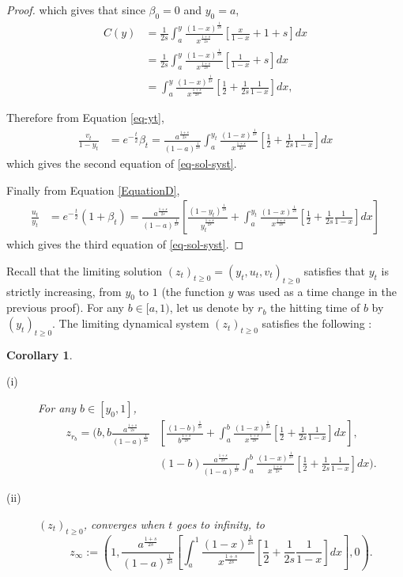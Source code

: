 \documentclass[11pt]{article}
\newtheorem{corollary}[theorem]{Corollary}
\theoremstyle{remark}
\numberwithin{equation}{section}
\begin{document}
\begin{proof}
which gives that since $\beta_0=0$ and $y_0=a$, 
\begin{align*}C(y)&=\frac{1}{2s}\int_a^{y}\frac{(1-x)^{\frac{1}{2s}}}{x^{\frac{1+s}{2s}}}\left[\frac{x}{1-x}+1+s\right]dx\\&=\frac{1}{2s}\int_a^{y}\frac{(1-x)^{\frac{1}{2s}}}{x^{\frac{1+s}{2s}}}\left[\frac{1}{1-x}+s\right]dx\\&=\int_a^{y}\frac{(1-x)^{\frac{1}{2s}}}{x^{\frac{1+s}{2s}}}\left[\frac{1}{2}+\frac{1}{2s}\frac{1}{1-x}\right]dx,\end{align*}

Therefore from Equation \eqref{eq-yt}, \begin{align*}\frac{v_t}{1-y_t}&=e^{-\frac{t}{2}}\beta_t=\frac{a^{\frac{1+s}{2s}}}{(1-a)^{\frac{1}{2s}}}\int_a^{y_t}\frac{(1-x)^{\frac{1}{2s}}}{x^{\frac{1+s}{2s}}}\left[\frac{1}{2}+\frac{1}{2s}\frac{1}{1-x}\right]dx\end{align*} which gives the second equation of \eqref{eq-sol-syst}.

Finally from Equation \eqref{EquationD}, 
\begin{align*}\frac{u_t}{y_t}&=e^{-\frac{t}{2}}(1+\beta_t)=\frac{a^{\frac{1+s}{2s}}}{(1-a)^{\frac{1}{2s}}}\left[\frac{(1-y_t)^{\frac{1}{2s}}}{y_t^{\frac{1+s}{2s}}}+\int_a^{y_t}\frac{(1-x)^{\frac{1}{2s}}}{x^{\frac{1+s}{2s}}}\left[\frac{1}{2}+\frac{1}{2s}\frac{1}{1-x}\right]dx\right]\end{align*} which gives the third equation of \eqref{eq-sol-syst}.
\end{proof}

Recall that the limiting solution $(z_t)_{t\geq0}=(y_t,u_t,v_t)_{t\geq0}$ satisfies that $y_t$ is strictly increasing, from $y_0$ to $1$ (the function $y$ was used as a time change in the previous proof). For any $b\in[a,1)$, let us denote by $r_b$ the hitting time of $b$ by $(y_t)_{t\geq0}$. The limiting dynamical system $(z_t)_{t\geq0}$ satisfies the following :
\begin{corollary} \label{cor-zb}
\begin{description}
\item[(i)] For any $b\in[y_0,1]$, \begin{align*}z_{r_b}=\Big(b,b\frac{a^{\frac{1+s}{2s}}}{(1-a)^{\frac{1}{2s}}}&\left[\frac{(1-b)^{\frac{1}{2s}}}{b^{\frac{1+s}{2s}}}+\int_a^{b}\frac{(1-x)^{\frac{1}{2s}}}{x^{\frac{1+s}{2s}}}\left[\frac{1}{2}+\frac{1}{2s}\frac{1}{1-x}\right]dx\right],\\&(1-b)\frac{a^{\frac{1+s}{2s}}}{(1-a)^{\frac{1}{2s}}}\int_a^{b}\frac{(1-x)^{\frac{1}{2s}}}{x^{\frac{1+s}{2s}}}\left[\frac{1}{2}+\frac{1}{2s}\frac{1}{1-x}\right]dx\Big).\end{align*}
\item[(ii)] $(z_t)_{t\geq0}$, converges when $t$ goes to infinity, to $$z_{\infty}:=\left(1,\frac{a^{\frac{1+s}{2s}}}{(1-a)^{\frac{1}{2s}}}\left[\int_a^1\frac{(1-x)^{\frac{1}{2s}}}{x^{\frac{1+s}{2s}}}\left[\frac{1}{2}+\frac{1}{2s}\frac{1}{1-x}\right]dx\right],0\right).$$
\end{description}
\end{corollary}
\end{document}
